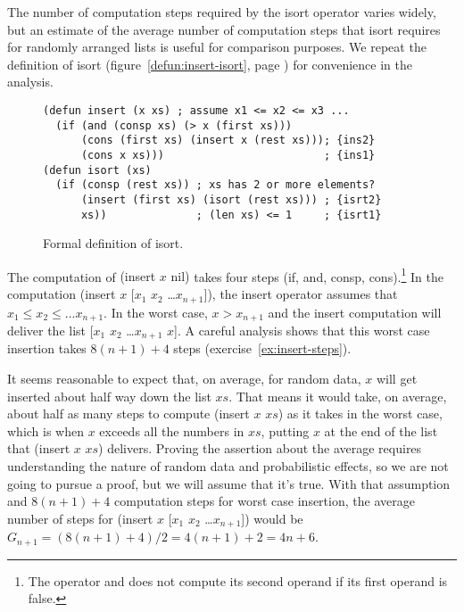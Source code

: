 The number of computation steps required by the
\textsf{isort} operator
varies widely, but
an estimate of the average number of computation steps that
\textsf{isort} requires for randomly arranged lists
is useful for comparison purposes.
We repeat the definition of \textsf{isort}
(figure~\ref{defun:insert-isort}, page \pageref{defun:insert-isort})
for convenience in the analysis.

\begin{figure}
\begin{code}
\begin{verbatim}
(defun insert (x xs) ; assume x1 <= x2 <= x3 ...
  (if (and (consp xs) (> x (first xs)))
      (cons (first xs) (insert x (rest xs))); {ins2}
      (cons x xs)))                         ; {ins1}
(defun isort (xs)
  (if (consp (rest xs)) ; xs has 2 or more elements?
      (insert (first xs) (isort (rest xs))) ; {isrt2}
      xs))              ; (len xs) <= 1     ; {isrt1}
\end{verbatim}
\end{code}
\caption{Formal definition of \textsf{isort}.}
\label{defun:insert-isort}\label{defun:isort-copy}
\end{figure}

The computation of \textsf{(insert $x$ nil)}
takes four steps
(\textsf{if}, \textsf{and}, \textsf{consp},
\textsf{cons}).\footnote{The operator \textsf{and}
does not compute its second operand if its first operand
is false.}
In the computation \textsf{(insert $x$ [$x_1$ $x_2$ \dots $x_{n+1}$])},
the \textsf{insert} operator assumes that
$x_1 \leq x_2 \leq \dots x_{n+1}$.
In the worst case, $x > x_{n+1}$ and the \textsf{insert} computation
will deliver the list [$x_1$ $x_2$ \dots $x_{n+1}$ $x$].
A careful analysis shows that this worst case insertion takes
$8(n+1)+4$ steps (exercise~\ref{ex:insert-steps}).

It seems reasonable to expect that, on average,
for random data, $x$ will get inserted about
half way down the list $xs$.
That means it would take, on average, about
half as many steps to compute \textsf{(insert $x$ $xs$)}
as it takes in the worst case,
which is when $x$ exceeds all the numbers
in $xs$, putting $x$ at the end of the
list that \textsf{(insert $x$ $xs$)} delivers.
Proving the assertion about the average
requires understanding the nature of random
data and probabilistic effects, so we are not going
to pursue a proof, but we will assume that it's true.
With that assumption and $8(n+1)+4$
computation steps for worst case insertion,
the average number of steps
for \textsf{(insert $x$ [$x_1$ $x_2$ \dots $x_{n+1}$])} would be
$G_{n+1} = (8(n+1)+4)/2 = 4(n+1)+2 = 4n+6$.

